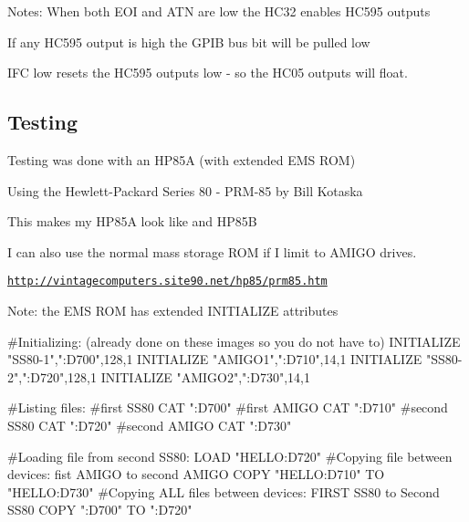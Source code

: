 Notes\+: When both E\+OI and A\+TN are low the H\+C32 enables H\+C595 outputs
\begin{DoxyItemize}
\item If any H\+C595 output is high the G\+P\+IB bus bit will be pulled low
\item I\+FC low resets the H\+C595 outputs low -\/ so the H\+C05 outputs will float.
\end{DoxyItemize}





\subsection*{Testing}


\begin{DoxyItemize}
\item Testing was done with an H\+P85A (with extended E\+MS R\+OM)
\begin{DoxyItemize}
\item Using the Hewlett-\/\+Packard Series 80 -\/ P\+R\+M-\/85 by Bill Kotaska
\item This makes my H\+P85A look like and H\+P85B
\begin{DoxyItemize}
\item I can also use the normal mass storage R\+OM if I limit to A\+M\+I\+GO drives.
\item \href{http://vintagecomputers.site90.net/hp85/prm85.htm}{\tt http\+://vintagecomputers.\+site90.\+net/hp85/prm85.\+htm}
\end{DoxyItemize}
\end{DoxyItemize}
\item Note\+: the E\+MS R\+OM has extended I\+N\+I\+T\+I\+A\+L\+I\+ZE attributes 
\begin{DoxyPre}
  #Initializing: (already done on these images so you do not have to)
  INITIALIZE "SS80-1",":D700",128,1
  INITIALIZE "AMIGO1",":D710",14,1
  INITIALIZE "SS80-2",":D720",128,1
  INITIALIZE "AMIGO2",":D730",14,1\end{DoxyPre}

\end{DoxyItemize}


\begin{DoxyPre}  #Listing files:
  #first SS80
  CAT ":D700"
  #first AMIGO
  CAT ":D710"
  #second SS80
  CAT ":D720"
  #second AMIGO
  CAT ":D730"\end{DoxyPre}



\begin{DoxyPre}  #Loading file from second SS80:
  LOAD "HELLO:D720"
  #Copying file between devices: fist AMIGO to second AMIGO
  COPY "HELLO:D710" TO "HELLO:D730"
  #Copying ALL files between devices: FIRST SS80 to Second SS80
  COPY ":D700" TO ":D720"
\end{DoxyPre}
 



